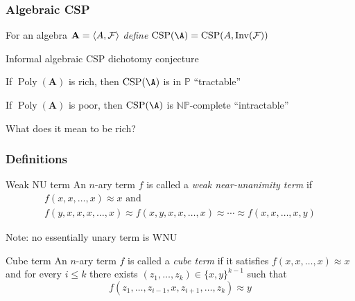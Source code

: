 \documentclass[10pt,xcolor=dvipsnames%
   ]{beamer}
\DeclareMathOperator{\CSP}{CSP}
\DeclareMathOperator{\Poly}{Poly}
\DeclareMathOperator{\Inv}{Inv}
\renewcommand{\.}{\cdot}
\newcommand{\bA}{\ensuremath{\mathbf{A}}}
\newcommand{\sF}{\ensuremath{\mathcal{F}}}
\newcommand{\reduc}{\leq_{\text{\textnormal{p}}}}
\newcommand{\equivp}{\equiv_{\text{\textnormal{p}}}}
\newcommand{\NP}{\ensuremath{\mathbb{NP}}\xspace}
\renewcommand{\P}{\ensuremath{\mathbb{P}}\xspace}
\begin{document}
\begin{frame}
  \frametitle{Algebraic CSP}

  For an algebra $\bA = \<A, \sF\>$ \emph{define}
  $\CSP(\A) = \CSP(A, \Inv(\sF))$

  \bigskip

  \begin{exampleblock}{Informal algebraic CSP dichotomy conjecture}

    \bigskip
    If $\Poly(\bA)$ is rich, then $\CSP(\A)$ is in $\P$ \hskip3mm ``tractable''
    
    \bigskip

    If $\Poly(\bA)$ is poor, then $\CSP(\A)$ is \NP-complete \hskip3mm ``intractable''
  \end{exampleblock}

  \pause

  What does it mean to be rich?


  

\end{frame}

\begin{frame}
  \frametitle{Definitions}
  \begin{exampleblock}{Weak NU term}
    An $n$-ary term $f$ is called a \emph{weak
      near-unanimity term} if 
       \begin{equation*}
       \begin{gathered}
       f(x,x,\dots,x) \approx x \text{ and}\\
    f(y,x,x,x,\dots,x) \approx f(x,y,x,x,\dots,x) \approx \cdots \approx
    f(x,x,\dots,x,y)
       \end{gathered}
  \end{equation*}
  \end{exampleblock}  
  Note: no essentially unary term is WNU
  \pause
  \begin{exampleblock}{Cube term}
    An $n$-ary term $f$ is called a \emph{cube term} if
    it satisfies $f(x,x,\dots,x) \approx x$ and for every $i \leq k$
    there exists $(z_1,\dots, z_k) \in \{x, y\}^{k-1}$ such that
    \[
    f(z_1, \dots, z_{i-1},x,z_{i+1}, \dots, z_k) \approx y
    \]
  \end{exampleblock}

\end{frame}
\end{document}
